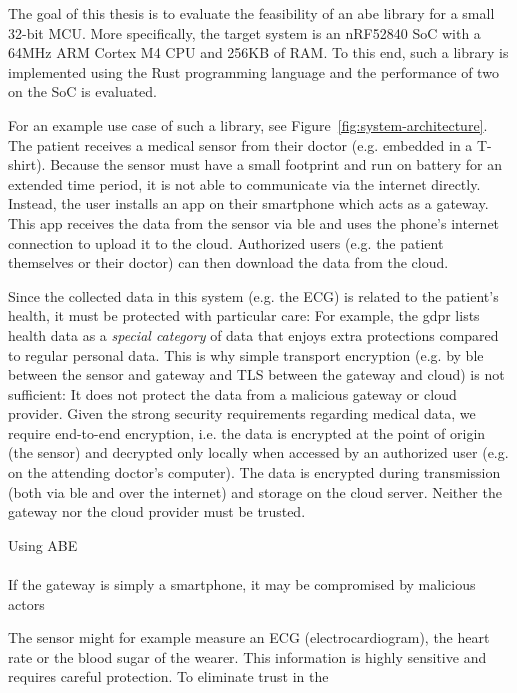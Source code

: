 The goal of this thesis is to evaluate the feasibility of an \acrshort{abe} library for a small 32-bit MCU.
More specifically, the target system is an nRF52840 SoC with a 64MHz ARM Cortex M4 CPU and 256KB of RAM.
To this end, such a library is implemented using the Rust programming language and the performance of two  on the SoC is evaluated.

For an example use case of such a library, see Figure~\ref{fig:system-architecture}.
The patient receives a medical sensor from their doctor (e.g. embedded in a T-shirt). 
Because the sensor must have a small footprint and run on battery for an extended time period, it is not able to communicate via the internet directly.
Instead, the user installs an app on their smartphone which acts as a gateway.
This app receives the data from the sensor via \acrfull{ble} and uses the phone's internet connection to upload it to the cloud.
Authorized users (e.g. the patient themselves or their doctor) can then download the data from the cloud.

Since the collected data in this system (e.g. the ECG) is related to the patient's health, it must be protected with particular care:
For example, the \acrshort{gdpr} lists health data as a \emph{special category} of data that enjoys extra protections compared to regular personal data. %
This is why simple transport encryption (e.g. by \acrshort{ble} between the sensor and gateway and TLS between the gateway and cloud) is not sufficient: It does not protect the data from a malicious gateway or cloud provider.
Given the strong security requirements regarding medical data, we require end-to-end encryption, i.e. the data is encrypted at the point of origin (the sensor) and decrypted only locally when accessed by an authorized user (e.g. on the attending doctor's computer).
The data is encrypted during transmission (both via \acrshort{ble} and over the internet) and storage on the cloud server.
Neither the gateway nor the cloud provider must be trusted.

Using \acrshort{ABE} 
~\\
~\\
If the gateway is simply a smartphone, it may be compromised by malicious actors

The sensor might for example measure an ECG (electrocardiogram), the heart rate or the blood sugar of the wearer.
This information is highly sensitive and requires careful protection.
To eliminate trust in the 


